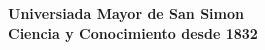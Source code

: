 \begin{titlepage}
	\begin{center}
		{\LARGE \textbf {Universiada Mayor de San Simon}}\\
		\vspace{0.25cm}
		{\large \textbf{Ciencia y Conocimiento desde 1832}}		
	\end{center}
\end{titlepage}